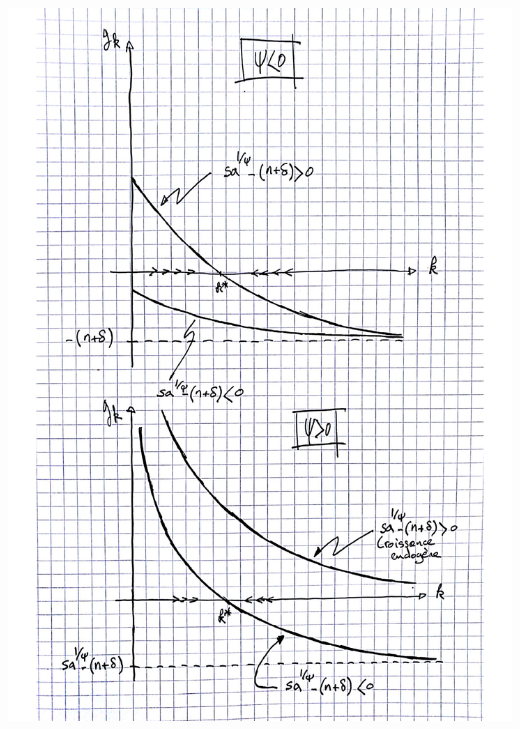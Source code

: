 \documentclass[11pt,a4paper,notitlepage]{article}
\begin{document}
\includegraphics[scale=.7]{graphique-rattrapage-2017.pdf}
\end{document}

